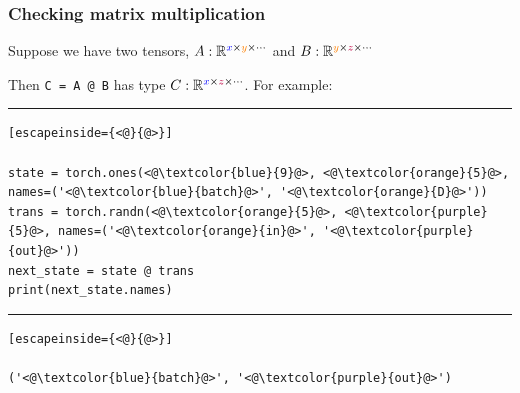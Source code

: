 \documentclass{beamer}
\begin{document}
%

    \begin{frame}[fragile]
        \frametitle{Checking matrix multiplication}

        Suppose we have two tensors, $A: \mathbb{R}^{\textcolor{blue}{x}\times \textcolor{orange}{y} \times \cdots}$ and $B: \mathbb{R}^{\textcolor{orange}{y}\times \textcolor{purple}{z} \times \cdots}$

        Then \texttt{C = A @ B} has type $C: \mathbb{R}^{\textcolor{blue}{x}\times \textcolor{purple}{z} \times \cdots}$. For example:

        \noindent\rule{\textwidth}{0.5pt}

        \begin{lstlisting}[escapeinside={<@}{@>}]

state = torch.ones(<@\textcolor{blue}{9}@>, <@\textcolor{orange}{5}@>, names=('<@\textcolor{blue}{batch}@>', '<@\textcolor{orange}{D}@>'))
trans = torch.randn(<@\textcolor{orange}{5}@>, <@\textcolor{purple}{5}@>, names=('<@\textcolor{orange}{in}@>', '<@\textcolor{purple}{out}@>'))
next_state = state @ trans
print(next_state.names)
        \end{lstlisting}
        \noindent\rule{\textwidth}{0.5pt}
        \begin{lstlisting}[escapeinside={<@}{@>}]

('<@\textcolor{blue}{batch}@>', '<@\textcolor{purple}{out}@>')
        \end{lstlisting}
    \end{frame}
\end{document}
